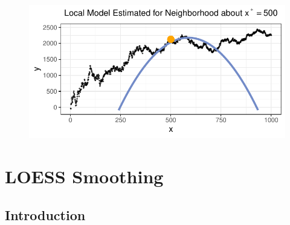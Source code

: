 \documentclass[12pt,twoside]{smiththesis}
\begin{document}
\begin{figure}

{\centering \includegraphics[width=1\linewidth]{thesis_files/figure-latex/unnamed-chunk-21-1} 

}

\caption{\label{fig:trunc}}\label{fig:unnamed-chunk-21}
\end{figure}
\newpage

\hypertarget{loess-smoothing}{%
\section{LOESS Smoothing}\label{loess-smoothing}}

\hypertarget{introduction-1}{%
\subsection{Introduction}\label{introduction-1}}
\end{document}
